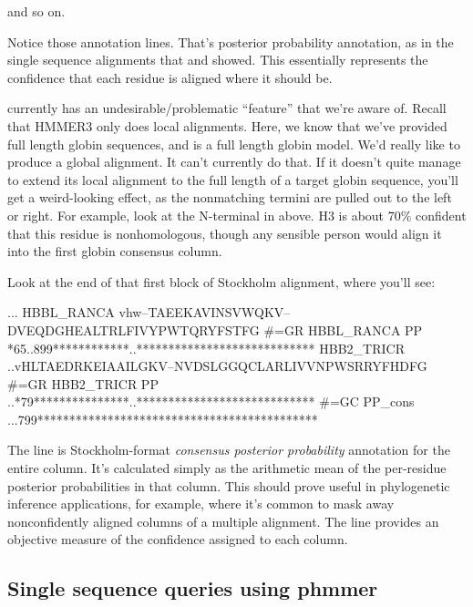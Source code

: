 and so on. 

Notice those  annotation lines. That's posterior probability
annotation, as in the single sequence alignments that 
and  showed. This essentially represents the
confidence that each residue is aligned where it should be.

 currently has an undesirable/problematic ``feature''
that we're aware of. Recall that HMMER3 only does local
alignments. Here, we know that we've provided full length globin
sequences, and  is a full length globin model. We'd
really like  to produce a global alignment. It can't
currently do that. If it doesn't quite manage to extend its local
alignment to the full length of a target globin sequence, you'll get a
weird-looking effect, as the nonmatching termini are pulled out to the
left or right. For example, look at the N-terminal  in
 above. H3 is about 70\% confident that this residue
is nonhomologous, though any sensible person would align it into the
first globin consensus column.

Look at the end of that first block of Stockholm alignment, where you'll
see:

\begin{sreoutput}
...
HBBL_RANCA         vhw--TAEEKAVINSVWQKV--DVEQDGHEALTRLFIVYPWTQRYFSTFG
#=GR HBBL_RANCA PP *65..899************..****************************
HBB2_TRICR         ..vHLTAEDRKEIAAILGKV--NVDSLGGQCLARLIVVNPWSRRYFHDFG
#=GR HBB2_TRICR PP ..*79***************..****************************
#=GC PP_cons       ...799********************************************
\end{sreoutput}

The  line is Stockholm-format \emph{consensus
posterior probability} annotation for the entire column. It's
calculated simply as the arithmetic mean of the per-residue posterior
probabilities in that column. This should prove useful in phylogenetic
inference applications, for example, where it's common to mask away
nonconfidently aligned columns of a multiple alignment. The
 line provides an objective measure of the confidence
assigned to each column.



\subsection{Single sequence queries using phmmer}

